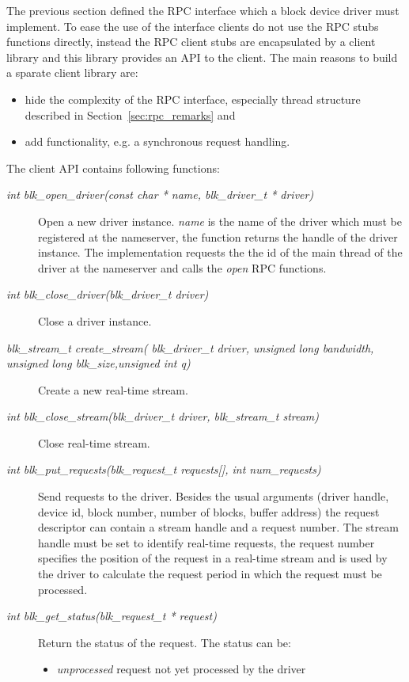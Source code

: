 \documentclass{article}
\begin{document}
The previous section defined the RPC interface which a block device driver 
must implement. To ease the use of the interface clients do not use the 
RPC stubs functions directly, instead the RPC client stubs are encapsulated 
by a client library and this library provides an API to the client. 
The main reasons to build a sparate client library are:
\begin{itemize}
\item hide the complexity of the RPC interface, especially thread structure 
  described in Section~\ref{sec:rpc_remarks} and
\item add functionality, e.g. a synchronous request handling.
\end{itemize}
The client API contains following functions:
\begin{description}
\item[\emph{int blk\_open\_driver(const char * name, blk\_driver\_t * driver)}]
  Open a new driver instance. \emph{name} is the name of the driver which must
  be registered at the nameserver, the function returns the handle of the 
  driver instance. The implementation requests the the id of the main thread of 
  the driver at the nameserver and calls the \emph{open} RPC functions.
\item[\emph{int blk\_close\_driver(blk\_driver\_t driver)}] 
  Close a driver instance.
\item[\emph{blk\_stream\_t create\_stream(
    blk\_driver\_t driver, unsigned long bandwidth, 
    unsigned long blk\_size,unsigned int q)}]
 Create a new real-time stream.
\item[\emph{int blk\_close\_stream(blk\_driver\_t driver, 
    blk\_stream\_t stream)}]
  Close real-time stream.
\item[\emph{int blk\_put\_requests(blk\_request\_t requests[],
    int num\_requests)}]
  Send requests to the driver. Besides the usual arguments (driver handle, 
  device id, block number, number of blocks, buffer address) the request 
  descriptor can contain a stream handle and a request number. The stream
  handle must be set to identify real-time requests, the request number
  specifies the position of the request in a real-time stream and is 
  used by the driver to calculate the request period in which the request 
  must be processed.
\item[\emph{int blk\_get\_status(blk\_request\_t * request)}]
  Return the status of the request. The status can be:
  \begin{itemize}
  \item \emph{unprocessed} request not yet processed by the driver

\end{itemize}
\end{description}
\end{document}
